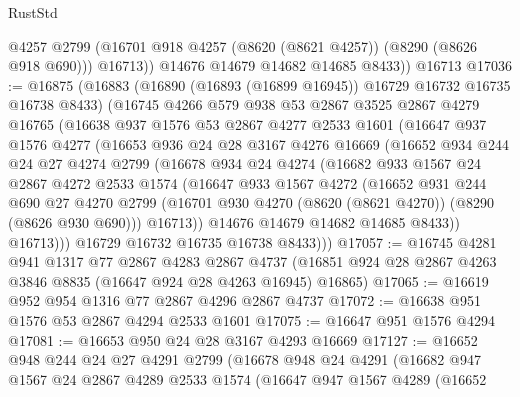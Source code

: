\begin{lexlean}{RustStd}
\begin{coremodule}
            @4257
            @2799
            (@16701 @918 @4257 (@8620 (@8621 @4257)) (@8290 (@8626 @918 @690)))
            @16713))
        @14676
        @14679
        @14682
        @14685
        @8433))
    @16713
@17036 := @16875
    (@16883
      (@16890 (@16893 (@16899 @16945)) @16729 @16732 @16735 @16738 @8433)
      (@16745
        @4266
        @579
        @938
        @53
        @2867
        @3525
        @2867
        @4279
        @16765
        (@16638
          @937
          @1576
          @53
          @2867
          @4277
          @2533
          @1601
          (@16647
            @937
            @1576
            @4277
            (@16653
              @936
              @24
              @28
              @3167
              @4276
              @16669
              (@16652
                @934
                @244
                @24
                @27
                @4274
                @2799
                (@16678
                  @934
                  @24
                  @4274
                  (@16682
                    @933
                    @1567
                    @24
                    @2867
                    @4272
                    @2533
                    @1574
                    (@16647
                      @933
                      @1567
                      @4272
                      (@16652
                        @931
                        @244
                        @690
                        @27
                        @4270
                        @2799
                        (@16701 @930 @4270 (@8620 (@8621 @4270)) (@8290 (@8626 @930 @690)))
                        @16713))
                    @14676
                    @14679
                    @14682
                    @14685
                    @8433))
                @16713)))
          @16729
          @16732
          @16735
          @16738
          @8433)))
@17057 := @16745
    @4281
    @941
    @1317
    @77
    @2867
    @4283
    @2867
    @4737
    (@16851 @924 @28 @2867 @4263 @3846 @8835 (@16647 @924 @28 @4263 @16945) @16865)
@17065 := @16619 @952 @954 @1316 @77 @2867 @4296 @2867 @4737
@17072 := @16638 @951 @1576 @53 @2867 @4294 @2533 @1601
@17075 := @16647 @951 @1576 @4294
@17081 := @16653 @950 @24 @28 @3167 @4293 @16669
@17127 := @16652
    @948
    @244
    @24
    @27
    @4291
    @2799
    (@16678
      @948
      @24
      @4291
      (@16682
        @947
        @1567
        @24
        @2867
        @4289
        @2533
        @1574
        (@16647
          @947
          @1567
          @4289
          (@16652

\end{coremodule}
\end{lexlean}
